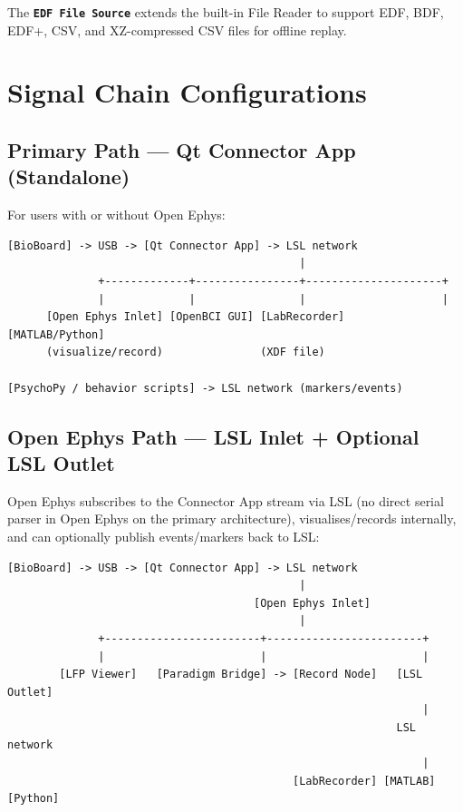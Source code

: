 \documentclass[11pt,a4paper]{article}
\newcommand{\component}[1]{\texttt{\textbf{#1}}}
\begin{document}
The \component{EDF File Source} extends the built-in File Reader to support
EDF, BDF, EDF+, CSV, and XZ-compressed CSV files for offline replay.


\section{Signal Chain Configurations}
\label{sec:signal-chains}

\subsection{Primary Path — Qt Connector App (Standalone)}

For users with or without Open Ephys:

\begin{lstlisting}
[BioBoard] -> USB -> [Qt Connector App] -> LSL network
                                             |
              +-------------+----------------+---------------------+
              |             |                |                     |
      [Open Ephys Inlet] [OpenBCI GUI] [LabRecorder]        [MATLAB/Python]
      (visualize/record)               (XDF file)

[PsychoPy / behavior scripts] -> LSL network (markers/events)
\end{lstlisting}

\subsection{Open Ephys Path — LSL Inlet + Optional LSL Outlet}

Open Ephys subscribes to the Connector App stream via LSL (no direct serial
parser in Open Ephys on the primary architecture), visualises/records
internally, and can optionally publish events/markers back to LSL:

\begin{lstlisting}
[BioBoard] -> USB -> [Qt Connector App] -> LSL network
                                             |
                                      [Open Ephys Inlet]
                                             |
              +------------------------+------------------------+
              |                        |                        |
        [LFP Viewer]   [Paradigm Bridge] -> [Record Node]   [LSL Outlet]
                                                                |
                                                            LSL network
                                                                |
                                            [LabRecorder] [MATLAB] [Python]
\end{lstlisting}
\end{document}
